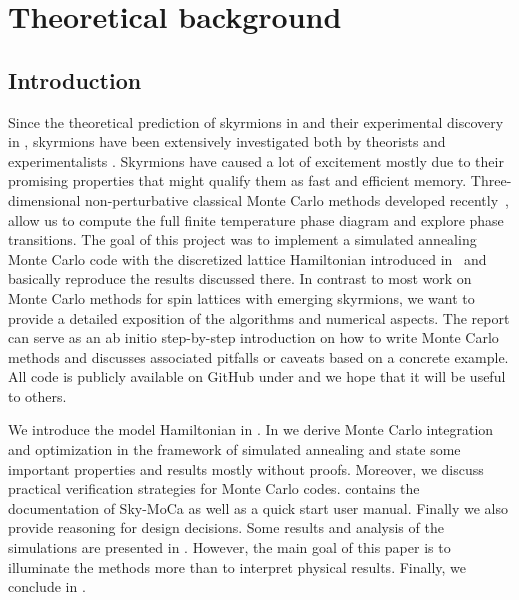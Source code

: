 %
\chapter{Theoretical background}\label{chap:1}
%
\section{Introduction}\label{sec:intro}
%
Since the theoretical prediction of skyrmions in 
 and their experimental discovery in  ,
skyrmions have been extensively investigated both by theorists and
experimentalists . Skyrmions have caused a lot of excitement
mostly due to their promising properties that might qualify them as fast and
efficient memory. Three-dimensional non-perturbative classical Monte Carlo
methods developed recently~\cite{skyrmionlattice}, allow us to compute the full
finite temperature phase diagram and explore phase transitions. The goal of this
project was to implement a simulated annealing Monte Carlo code with the
discretized lattice Hamiltonian introduced in~\cite{skyrmionlattice} and
basically reproduce the results discussed there. In contrast to most work on
Monte Carlo methods for spin lattices with emerging skyrmions, we want to
provide a detailed exposition of the algorithms and numerical aspects. The
report can serve as an ab initio step-by-step introduction on how to write Monte
Carlo methods and discusses associated pitfalls or caveats based on a concrete
example. All code is publicly available on GitHub under  and we hope
that it will be useful to others.

We introduce the model Hamiltonian in . In
 we derive Monte Carlo integration and optimization in the
framework of simulated annealing and state some important properties and results
mostly without proofs. Moreover, we discuss practical verification strategies
for Monte Carlo codes.  contains the documentation of Sky-MoCa
as well as a quick start user manual. Finally we also provide reasoning for
design decisions. Some results and analysis of the simulations are presented in
. However, the main goal of this paper is to illuminate the
methods more than to interpret physical results. Finally, we conclude in
.
%
